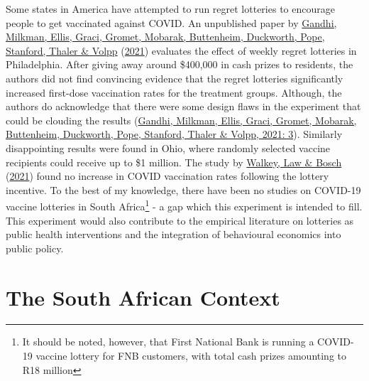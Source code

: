 \documentclass[11pt,preprint, authoryear]{elsarticle}
\numberwithin{equation}{section}
\numberwithin{figure}{section}
\numberwithin{table}{section}
\let\rmarkdownfootnote\footnote%
\def\footnote{\protect\rmarkdownfootnote}
\begin{document}
Some states in America have attempted to run regret lotteries to
encourage people to get vaccinated against COVID. An unpublished paper
by \protect\hyperlink{ref-duck}{Gandhi, Milkman, Ellis, Graci, Gromet,
Mobarak, Buttenheim, Duckworth, Pope, Stanford, Thaler \& Volpp}
(\protect\hyperlink{ref-duck}{2021}) evaluates the effect of weekly
regret lotteries in Philadelphia. After giving away around \$400,000 in
cash prizes to residents, the authors did not find convincing evidence
that the regret lotteries significantly increased first-dose vaccination
rates for the treatment groups. Although, the authors do acknowledge
that there were some design flaws in the experiment that could be
clouding the results (\protect\hyperlink{ref-duck}{Gandhi, Milkman,
Ellis, Graci, Gromet, Mobarak, Buttenheim, Duckworth, Pope, Stanford,
Thaler \& Volpp, 2021: 3}). Similarly disappointing results were found
in Ohio, where randomly selected vaccine recipients could receive up to
\$1 million. The study by \protect\hyperlink{ref-ohio}{Walkey, Law \&
Bosch} (\protect\hyperlink{ref-ohio}{2021}) found no increase in COVID
vaccination rates following the lottery incentive. To the best of my
knowledge, there have been no studies on COVID-19 vaccine lotteries in
South Africa\footnote{It should be noted, however, that First National
  Bank is running a COVID-19 vaccine lottery for FNB customers, with
  total cash prizes amounting to R18 million} - a gap which this
experiment is intended to fill. This experiment would also contribute to
the empirical literature on lotteries as public health interventions and
the integration of behavioural economics into public policy.

\hypertarget{the-south-african-context}{%
\section{\texorpdfstring{The South African Context
\label{context}}{The South African Context }}\label{the-south-african-context}}
\end{document}
